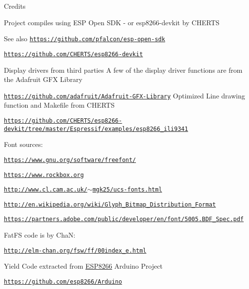 \begin{DoxyParagraph}{Credits}

\begin{DoxyItemize}
\item Project compiles using E\+SP Open S\+DK -\/ or esp8266-\/devkit by C\+H\+E\+R\+TS 
\end{DoxyItemize}
\end{DoxyParagraph}
\begin{DoxySeeAlso}{See also}
\href{https://github.com/pfalcon/esp-open-sdk}{\tt https\+://github.\+com/pfalcon/esp-\/open-\/sdk} 

\href{https://github.com/CHERTS/esp8266-devkit}{\tt https\+://github.\+com/\+C\+H\+E\+R\+T\+S/esp8266-\/devkit}
\begin{DoxyItemize}
\item Display drivers from third parties A few of the display driver functions are from the Adafruit G\+FX Library 
\end{DoxyItemize}

\href{https://github.com/adafruit/Adafruit-GFX-Library}{\tt https\+://github.\+com/adafruit/\+Adafruit-\/\+G\+F\+X-\/\+Library} Optimized Line drawing function and Makefile from C\+H\+E\+R\+TS 

\href{https://github.com/CHERTS/esp8266-devkit/tree/master/Espressif/examples/esp8266_ili9341}{\tt https\+://github.\+com/\+C\+H\+E\+R\+T\+S/esp8266-\/devkit/tree/master/\+Espressif/examples/esp8266\+\_\+ili9341}
\begin{DoxyItemize}
\item Font sources\+: 
\end{DoxyItemize}

\href{https://www.gnu.org/software/freefont/}{\tt https\+://www.\+gnu.\+org/software/freefont/} 

\href{https://www.rockbox.org}{\tt https\+://www.\+rockbox.\+org} 

\href{http://www.cl.cam.ac.uk/~mgk25/ucs-fonts.html}{\tt http\+://www.\+cl.\+cam.\+ac.\+uk/$\sim$mgk25/ucs-\/fonts.\+html} 

\href{http://en.wikipedia.org/wiki/Glyph_Bitmap_Distribution_Format}{\tt http\+://en.\+wikipedia.\+org/wiki/\+Glyph\+\_\+\+Bitmap\+\_\+\+Distribution\+\_\+\+Format} 

\href{https://partners.adobe.com/public/developer/en/font/5005.BDF_Spec.pdf}{\tt https\+://partners.\+adobe.\+com/public/developer/en/font/5005.\+B\+D\+F\+\_\+\+Spec.\+pdf}
\begin{DoxyItemize}
\item Fat\+FS code is by ChaN\+: 
\end{DoxyItemize}

\href{http://elm-chan.org/fsw/ff/00index_e.html}{\tt http\+://elm-\/chan.\+org/fsw/ff/00index\+\_\+e.\+html}
\begin{DoxyItemize}
\item Yield Code extracted from \hyperlink{cpu_8h_af917fb5672b9339e228304f59f3b250a}{E\+S\+P8266} Arduino Project 
\end{DoxyItemize}

\href{https://github.com/esp8266/Arduino}{\tt https\+://github.\+com/esp8266/\+Arduino} 


\end{DoxySeeAlso}
